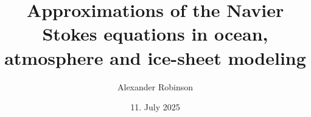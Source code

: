 



\title[Navier Stokes equations]{Approximations of the Navier Stokes equations in ocean, atmosphere and ice-sheet modeling}


\author[A. Robinson]{Alexander Robinson }  %



\vspace{-2cm}\date{11. July 2025}

    
    

